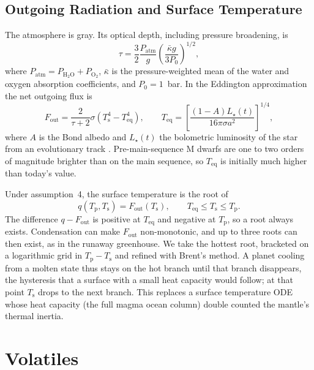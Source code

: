 \documentclass[11pt]{article}
\newcommand{\Tp}{T_\mathrm{p}}
\newcommand{\Ts}{T_\mathrm{s}}
\newcommand{\Teq}{T_\mathrm{eq}}
\begin{document}
\subsection{Outgoing Radiation and Surface Temperature}

The atmosphere is gray. Its optical depth, including pressure broadening, is
\begin{equation}
\tau = \frac{3}{2} \frac{P_\mathrm{atm}}{g} \left( \frac{\bar{\kappa} g}{3 P_0} \right)^{1/2},
\end{equation}
where $P_\mathrm{atm} = P_{\mathrm{H_2O}} + P_{\mathrm{O_2}}$, $\bar{\kappa}$ is the pressure-weighted mean of the water and oxygen absorption coefficients, and $P_0 = 1$~bar. In the Eddington approximation the net outgoing flux is
\begin{equation}
F_\mathrm{out} = \frac{2}{\tau + 2} \sigma \left( \Ts^4 - \Teq^4 \right),
\qquad \Teq = \left[ \frac{(1 - A) L_\star(t)}{16 \pi \sigma a^2} \right]^{1/4},
\end{equation}
where $A$ is the Bond albedo and $L_\star(t)$ the bolometric luminosity of the star from an evolutionary track \citep{Baraffe2015}. Pre-main-sequence M dwarfs are one to two orders of magnitude brighter than on the main sequence, so $\Teq$ is initially much higher than today's value.

Under assumption~4, the surface temperature is the root of
\begin{equation}
q(\Tp, \Ts) = F_\mathrm{out}(\Ts), \qquad \Teq \le \Ts \le \Tp.
\end{equation}
The difference $q - F_\mathrm{out}$ is positive at $\Teq$ and negative at $\Tp$, so a root always exists. Condensation can make $F_\mathrm{out}$ non-monotonic, and up to three roots can then exist, as in the runaway greenhouse. We take the hottest root, bracketed on a logarithmic grid in $\Tp - \Ts$ and refined with Brent's method. A planet cooling from a molten state thus stays on the hot branch until that branch disappears, the hysteresis that a surface with a small heat capacity would follow; at that point $\Ts$ drops to the next branch. This replaces a surface temperature ODE whose heat capacity (the full magma ocean column) double counted the mantle's thermal inertia.

\section{Volatiles}\label{sec:volatiles}
\end{document}

